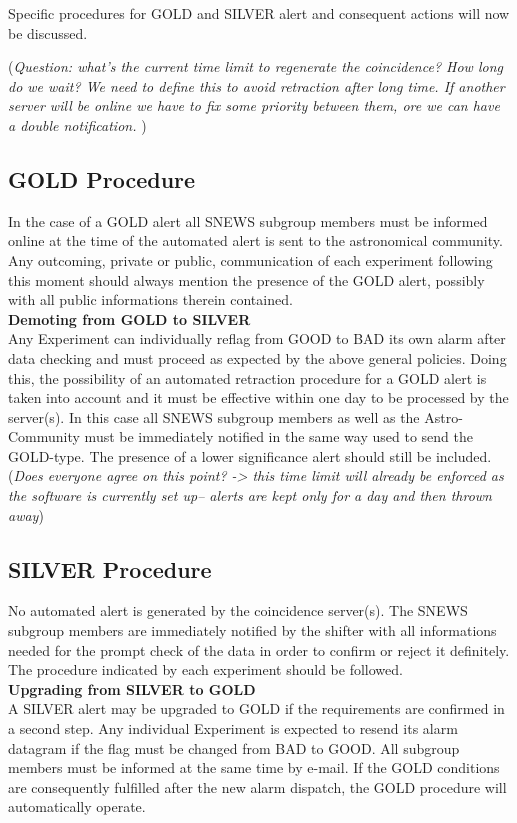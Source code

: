 \documentclass{article}
\begin{document}
Specific procedures for GOLD and SILVER alert and consequent actions 
will now be discussed.

({\it Question: what's the current time limit to regenerate the coincidence?
How long do we wait? We need to define this to avoid retraction after long 
time. If another server will be online we have to fix some priority between 
them, ore we can have a double notification.
})

\subsection{GOLD Procedure}\label{GOLD}

In the case of a GOLD alert all SNEWS subgroup members must be informed
online at the time of the automated alert is sent to the astronomical
community.
Any outcoming, private or public, communication of each experiment following 
this moment should always 
mention the presence of the GOLD alert, possibly with all public informations
therein contained.\\

{\bf Demoting from GOLD to SILVER}\\ Any Experiment can individually
reflag from GOOD to BAD its own alarm after data checking and must
proceed as expected by the above general policies.  Doing this, the
possibility of an automated retraction procedure for a GOLD alert is
taken into account and it must be effective within one day to be
processed by the server(s). In this case all SNEWS subgroup
members as well as the Astro-Community must be immediately notified in
the same way used to send the GOLD-type. The presence of a lower
significance alert should still be included.({\it Does everyone agree
on this point? -> this time limit will already be enforced as
the software is currently set up-- alerts are kept only for a day
and then thrown away})

\subsection{SILVER Procedure}\label{SILVER}
No automated alert is generated by the coincidence server(s). 
The SNEWS subgroup members are immediately notified by the shifter 
with all informations needed for the prompt check of the data in order to 
confirm or reject it definitely.
The procedure indicated by each experiment should be followed.\\


\textbf{Upgrading from SILVER to GOLD}\\
A SILVER alert may be upgraded to GOLD if the requirements are
confirmed in a second step. Any individual Experiment is expected to
resend its alarm datagram if the flag must be changed from BAD to
GOOD. All subgroup members must be informed at the same time by
e-mail. If the GOLD conditions are consequently fulfilled after the
new alarm dispatch, the GOLD procedure will automatically operate.
\end{document}
